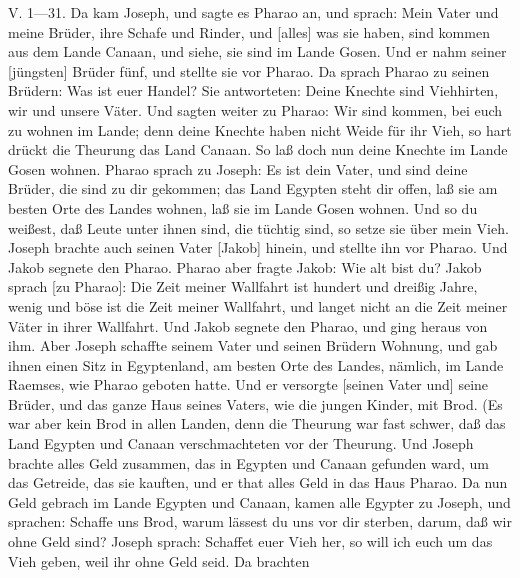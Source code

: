 \begin{schriftzitat}
V. 1—31. Da kam Joseph, und sagte es Pharao an, und sprach: Mein Vater und meine Brüder, ihre Schafe und Rinder, und [alles] was sie haben, sind kommen aus dem Lande Canaan, und siehe, sie sind im Lande Gosen. Und er nahm seiner [jüngsten] Brüder fünf, und stellte sie vor Pharao. Da sprach Pharao zu seinen Brüdern: Was ist euer Handel? Sie antworteten: Deine Knechte sind Viehhirten, wir und unsere Väter. Und sagten weiter zu Pharao: Wir sind kommen, bei euch zu wohnen im Lande; denn deine Knechte haben nicht Weide für ihr Vieh, so hart drückt die Theurung das Land Canaan. So laß doch nun deine Knechte im Lande Gosen wohnen. Pharao sprach zu Joseph: Es ist dein Vater, und sind deine Brüder, die sind zu dir gekommen; das Land Egypten steht dir offen, laß sie am besten Orte des Landes wohnen, laß sie im Lande Gosen wohnen. Und so du weißest, daß Leute unter ihnen sind, die tüchtig sind, so setze sie über mein Vieh. Joseph brachte auch seinen Vater [Jakob] hinein, und stellte ihn vor Pharao. Und Jakob segnete den Pharao. Pharao aber fragte Jakob: Wie alt bist du? Jakob sprach [zu Pharao]: Die Zeit meiner Wallfahrt ist hundert und dreißig Jahre, wenig und böse ist die Zeit meiner Wallfahrt, und langet nicht an die Zeit meiner Väter in ihrer Wallfahrt. Und Jakob segnete den Pharao, und ging heraus von ihm. Aber Joseph schaffte seinem Vater und seinen Brüdern Wohnung, und gab ihnen einen Sitz in Egyptenland, am besten Orte des Landes, nämlich, im Lande Raemses, wie Pharao geboten hatte. Und er versorgte [seinen Vater und] seine Brüder, und das ganze Haus seines Vaters, wie die jungen Kinder, mit Brod. (Es war aber kein Brod in allen Landen, denn die Theurung war fast schwer, daß das Land Egypten und Canaan verschmachteten vor der Theurung. Und Joseph brachte alles Geld zusammen, das in Egypten und Canaan gefunden ward, um das Getreide, das sie kauften, und er that alles Geld in das Haus Pharao. Da nun Geld gebrach im Lande Egypten und Canaan, kamen alle Egypter zu Joseph, und sprachen: Schaffe uns Brod, warum lässest du uns vor dir sterben, darum, daß wir ohne Geld sind? Joseph sprach: Schaffet euer Vieh her, so will ich euch um das Vieh geben, weil ihr ohne Geld seid. Da brachten

\end{schriftzitat}
